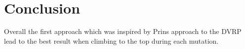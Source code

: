 \section{Conclusion}
Overall the first approach which was inspired by Prins \cite{prins2004simple} approach to the DVRP lead to the best result when climbing to the top during each mutation.


